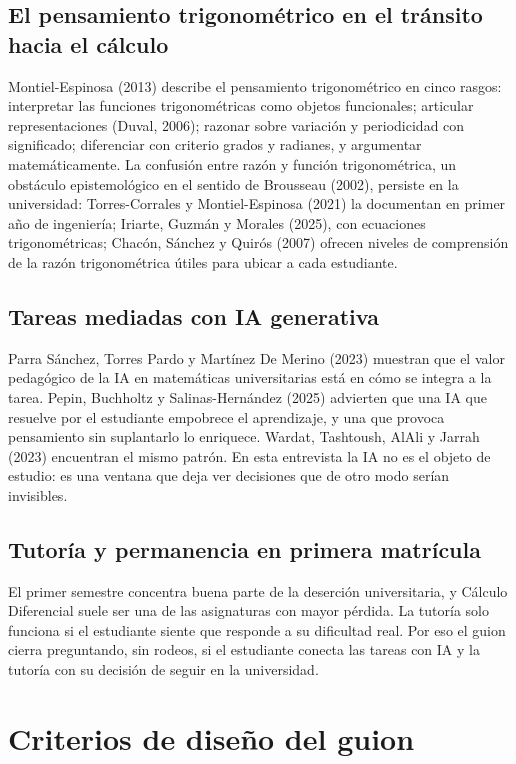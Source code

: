 \documentclass[11pt,letterpaper]{article}
\newcounter{preg}
\begin{document}
\subsection{El pensamiento trigonométrico en el tránsito hacia el cálculo}
Montiel-Espinosa (2013) describe el pensamiento trigonométrico en cinco rasgos: interpretar las funciones trigonométricas como objetos funcionales; articular representaciones (Duval, 2006); razonar sobre variación y periodicidad con significado; diferenciar con criterio grados y radianes, y argumentar matemáticamente. La confusión entre razón y función trigonométrica, un obstáculo epistemológico en el sentido de Brousseau (2002), persiste en la universidad: Torres-Corrales y Montiel-Espinosa (2021) la documentan en primer año de ingeniería; Iriarte, Guzmán y Morales (2025), con ecuaciones trigonométricas; Chacón, Sánchez y Quirós (2007) ofrecen niveles de comprensión de la razón trigonométrica útiles para ubicar a cada estudiante.

\subsection{Tareas mediadas con IA generativa}
Parra Sánchez, Torres Pardo y Martínez De Merino (2023) muestran que el valor pedagógico de la IA en matemáticas universitarias está en cómo se integra a la tarea. Pepin, Buchholtz y Salinas-Hernández (2025) advierten que una IA que resuelve por el estudiante empobrece el aprendizaje, y una que provoca pensamiento sin suplantarlo lo enriquece. Wardat, Tashtoush, AlAli y Jarrah (2023) encuentran el mismo patrón. En esta entrevista la IA no es el objeto de estudio: es una ventana que deja ver decisiones que de otro modo serían invisibles.

\subsection{Tutoría y permanencia en primera matrícula}
El primer semestre concentra buena parte de la deserción universitaria, y Cálculo Diferencial suele ser una de las asignaturas con mayor pérdida. La tutoría solo funciona si el estudiante siente que responde a su dificultad real. Por eso el guion cierra preguntando, sin rodeos, si el estudiante conecta las tareas con IA y la tutoría con su decisión de seguir en la universidad.

\section{Criterios de diseño del guion}\label{sec:criterios}
\end{document}
